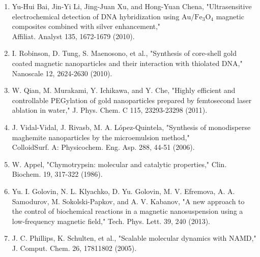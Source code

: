 \documentclass[10pt, a4paper]{article}
\begin{document}
\begin{enumerate}
  \item Yu-Hui Bai, Jin-Yi Li, Jing-Juan Xu, and Hong-Yuan Chena, "Ultrasensitive electrochemical detection of DNA hybridization using \(\mathrm{Au} / \mathrm{Fe}_{3} \mathrm{O}_{4}\) magnetic composites combined with silver enhancement," \\
  Affiliat. Analyst 135, 1672-1679 (2010).
  \item I. Robinson, D. Tung, S. Maenosono, et al., "Synthesis of core-shell gold coated magnetic nanoparticles and their interaction with thiolated DNA," \\
  Nanoscale 12, 2624-2630 (2010).
  \item W. Qian, M. Murakami, Y. Ichikawa, and Y. Che, "Highly efficient and controllable PEGylation of gold nanoparticles prepared by femtosecond laser ablation in water," J. Phys. Chem. C 115, 23293-23298 (2011).
  \item J. Vidal-Vidal, J. Rivasb, M. A. López-Quintela, "Synthesis of monodisperse maghemite nanoparticles by the microemulsion method," \\
  ColloidSurf. A: Physicochem. Eng. Asp. 288, 44-51 (2006).
  \item W. Appel, "Chymotrypsin: molecular and catalytic properties," Clin. Biochem. 19, 317-322 (1986).
  \item Yu. I. Golovin, N. L. Klyachko, D. Yu. Golovin, M. V. Efremova, A. A. Samodurov, M. Sokolski-Papkov, and A. V. Kabanov, "A new approach to the control of biochemical reactions in a magnetic nanosuspension using a low-frequency magnetic field," Tech. Phys. Lett. 39, 240 (2013).
  \item J. C. Phillips, K. Schulten, et al., "Scalable molecular dynamics with NAMD," J. Comput. Chem. 26, 17811802 (2005).
\end{enumerate}
\end{document}
